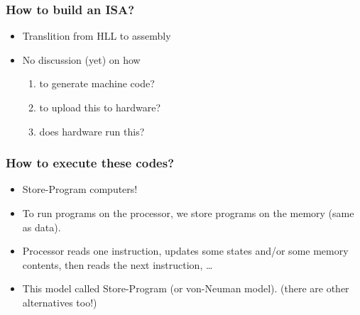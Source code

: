 \documentclass[10pt]{article}
\begin{document}
\subsubsection*{How to build an ISA?}
\begin{itemize}
    \item Translition from HLL to assembly
    \item No discussion (yet) on how
    \begin{enumerate}
        \item to generate machine code?
        \item to upload this to hardware?
        \item does hardware run this?
    \end{enumerate}
\end{itemize}
\subsubsection*{How to execute these codes?}
\begin{itemize}
    \item Store-Program computers!
    \item To run programs on the processor, we store programs on the memory (same as data).
    \item Processor reads one instruction, updates some states and/or some memory contents, then reads the next instruction, \dots
    \item This model called Store-Program (or von-Neuman model).  (there are other alternatives too!)
\end{itemize}
\end{document}
